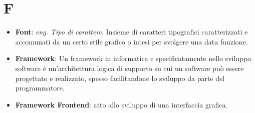 \section*{F}
\begin{itemize}
	\item
	\textbf{Font}: \textit{eng. Tipo di carattere}. Insieme di caratteri tipografici caratterizzati e accomunati da un certo stile grafico o intesi per svolgere una data funzione.
	\item
	\textbf{Framework}: Un framework in informatica e specificatamente nello sviluppo software è un'architettura logica di supporto su cui un software può essere progettato e realizzato, spesso facilitandone lo sviluppo da parte del programmatore.
	\item
	\textbf{Framework Frontend}:  atto allo sviluppo di una interfaccia grafica.
\end{itemize}
\newpage